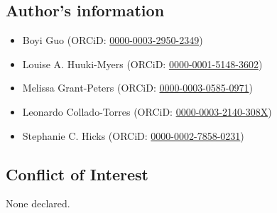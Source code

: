 \documentclass[10pt,twocolumn]{article}
\begin{document}
\subsection*{Author’s information}

\begin{itemize}[nosep]
    \item Boyi Guo (ORCiD: \href{https://orcid.org/0000-0003-2950-2349}{0000-0003-2950-2349})
    \item Louise A. Huuki-Myers (ORCiD: \href{https://orcid.org/0000-0001-5148-3602}{0000-0001-5148-3602})
    \item Melissa Grant-Peters (ORCiD: \href{https://orcid.org/0000-0003-0585-0971}{0000-0003-0585-0971})
    \item Leonardo Collado-Torres (ORCiD: \href{https://orcid.org/0000-0003-2140-308X}{0000-0003-2140-308X})
    \item Stephanie C. Hicks (ORCiD: \href{https://orcid.org/0000-0002-7858-0231}{0000-0002-7858-0231})
\end{itemize} 

\subsection*{Conflict of Interest} 
None declared.
















\end{document}
